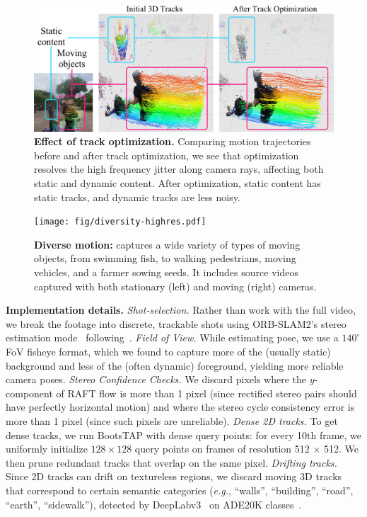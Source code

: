\begin{figure}[t]
    \centering
    \includegraphics[width=\linewidth]{fig/optimization.pdf}
    \caption{\textbf{Effect of track optimization.} Comparing motion trajectories before and after track optimization, we see that optimization resolves the high frequency jitter along camera rays, affecting both static and dynamic content. After optimization, static content has static tracks, and dynamic tracks are less noisy.}
    \label{fig:track_optimization}
\end{figure}


\begin{figure}[t]
\vspace{-1em}
    \centering
    \texttt{[image: fig/diversity-highres.pdf]}
    \caption{\textbf{Diverse motion:} \dataset captures a wide variety of types of moving objects, from swimming fish, to walking pedestrians, moving vehicles, and a farmer sowing seeds. It includes source videos captured with both stationary (left) and moving (right) cameras.}
    \label{fig:motion_distribution}
\end{figure}
\medskip
\noindent \textbf{Implementation details.} %
{\it Shot-selection.} Rather than work with the full video, we break the footage into discrete, trackable shots using ORB-SLAM2's stereo estimation mode~\cite{murartal2015orbslam} following~\cite{zhou2018stereo}. 
{\it Field of View.} While estimating pose, we use a $140^\circ$ FoV fisheye format, which we found to capture more of the (usually static) background and less of the (often dynamic) foreground, yielding more reliable camera poses. 
{\it Stereo Confidence Checks.} We discard pixels where the $y$-component of RAFT flow is more than 1 pixel (since rectified stereo pairs should have perfectly horizontal motion) and where the stereo cycle consistency error is more than 1 pixel (since such pixels are unreliable). 
{\it Dense 2D tracks.} To get dense tracks, we run BootsTAP with dense query points: for every 10th frame, we uniformly initialize $128\times128$ query points on frames of resolution 512 $\times$ 512. We then prune redundant tracks that overlap on the same pixel.
{\it Drifting tracks.} Since 2D tracks can drift on textureless regions, we discard moving 3D tracks that correspond to certain semantic categories (\textit{e.g.}, ``walls'', ``building'', ``road'', ``earth'', ``sidewalk''), detected by DeepLabv3~\cite{chen2017rethinking} on ADE20K classes~\cite{zhou2017scene, zhou2019semantic}.

